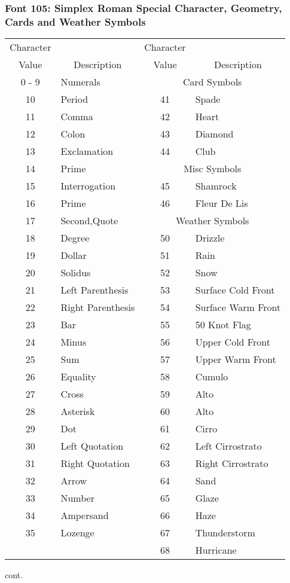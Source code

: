 \subsubsection{Font 105: Simplex Roman Special Character, 
Geometry, Cards and Weather Symbols}
\begin{tabular}{|c|l|c|l|}
\hline
\multicolumn{1}{|c|}{Character}
& & \multicolumn{1}{|c|}{Character}&\\
\multicolumn{1}{|c|}{Value}
&\multicolumn{1}{|c|}{Description}
&\multicolumn{1}{|c|}{Value}
&\multicolumn{1}{|c|}{Description}\\
\hline
0 - 9 & Numerals 
&\multicolumn{2}{|c|}{Card Symbols}\\
\cline{3-4}
10 & Period & 41 & Spade\\
11 & Comma & 42 & Heart\\
12 & Colon & 43 & Diamond\\
13 & Exclamation & 44 & Club\\
\cline{3-4}
14 & Prime 
&\multicolumn{2}{|c|}{Misc Symbols}\\
\cline{3-4}
15 & Interrogation & 45 & Shamrock\\
16 & Prime & 46 & Fleur De Lis\\
\cline{3-4}
17 & Second,Quote
&\multicolumn{2}{|c|}{Weather Symbols}\\
\cline{3-4}
18 & Degree & 50 & Drizzle\\
19 & Dollar & 51 & Rain\\
20 & Solidus & 52 & Snow\\
21 & Left Parenthesis & 53 & Surface Cold Front\\
22 & Right Parenthesis & 54 & Surface Warm Front\\
23 & Bar & 55 & 50 Knot Flag\\
24 & Minus & 56 & Upper Cold Front\\
25 & Sum & 57 & Upper Warm Front\\
26 & Equality & 58 & Cumulo\\
27 & Cross & 59 & Alto\\
28 & Asterisk & 60 & Alto\\
29 & Dot & 61 & Cirro\\
30 & Left Quotation & 62 & Left Cirrostrato\\
31 & Right Quotation & 63 & Right Cirrostrato\\
32 & Arrow & 64 & Sand\\
33 & Number & 65 & Glaze\\
34 & Ampersand & 66 & Haze\\
35 & Lozenge & 67 & Thunderstorm\\
& & 68 & Hurricane\\
\hline
\end{tabular}
\newpage
cont.

